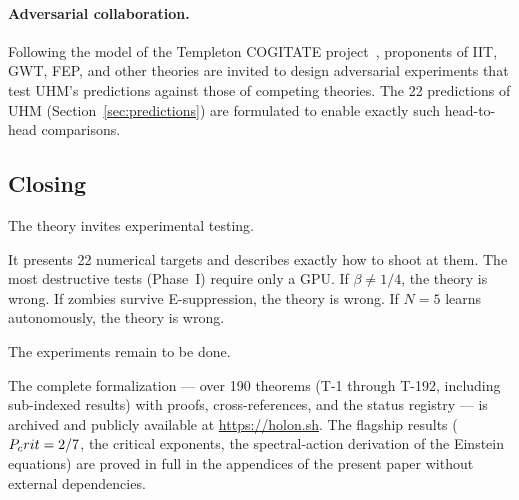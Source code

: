 \paragraph{Adversarial collaboration.}
Following the model of the Templeton COGITATE project~\cite{cogitate2025},
proponents of IIT, GWT, FEP, and other theories are invited to design
adversarial experiments that test UHM's predictions against those of
competing theories. The 22 predictions of UHM
(Section~\ref{sec:predictions}) are formulated to enable exactly such
head-to-head comparisons.

\subsection{Closing}

The theory invites experimental testing.

It presents 22 numerical targets and describes exactly how to shoot at them.
The most destructive tests (Phase~I) require only a GPU. If $\beta \neq 1/4$, the theory
is wrong. If zombies survive E-suppression, the theory is wrong. If $N = 5$ learns
autonomously, the theory is wrong.

The experiments remain to be done.

The complete formalization --- over 190 theorems (T-1 through T-192, including
sub-indexed results) with proofs, cross-references, and the status registry ---
is archived and publicly available at \url{https://holon.sh}.
The flagship results ($P_crit = 2/7$, the critical exponents, the spectral-action
derivation of the Einstein equations) are proved in full in the appendices of the
present paper without external dependencies.

